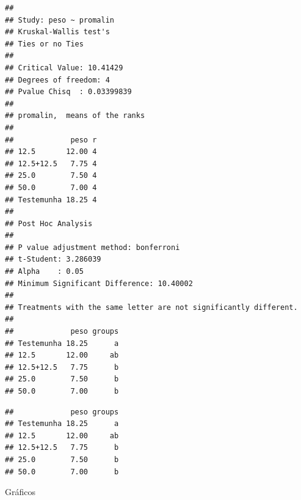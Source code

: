 \documentclass[
]{book}
\newenvironment{Shaded}{\begin{snugshade}}{\end{snugshade}}
\newcommand{\DataTypeTok}[1]{\textcolor[rgb]{0.13,0.29,0.53}{#1}}
\newcommand{\DecValTok}[1]{\textcolor[rgb]{0.00,0.00,0.81}{#1}}
\newcommand{\FloatTok}[1]{\textcolor[rgb]{0.00,0.00,0.81}{#1}}
\newcommand{\KeywordTok}[1]{\textcolor[rgb]{0.13,0.29,0.53}{\textbf{#1}}}
\newcommand{\NormalTok}[1]{#1}
\newcommand{\OperatorTok}[1]{\textcolor[rgb]{0.81,0.36,0.00}{\textbf{#1}}}
\newcommand{\OtherTok}[1]{\textcolor[rgb]{0.56,0.35,0.01}{#1}}
\newcommand{\StringTok}[1]{\textcolor[rgb]{0.31,0.60,0.02}{#1}}
\begin{document}
\begin{verbatim}
## 
## Study: peso ~ promalin
## Kruskal-Wallis test's
## Ties or no Ties
## 
## Critical Value: 10.41429
## Degrees of freedom: 4
## Pvalue Chisq  : 0.03399839 
## 
## promalin,  means of the ranks
## 
##             peso r
## 12.5       12.00 4
## 12.5+12.5   7.75 4
## 25.0        7.50 4
## 50.0        7.00 4
## Testemunha 18.25 4
## 
## Post Hoc Analysis
## 
## P value adjustment method: bonferroni
## t-Student: 3.286039
## Alpha    : 0.05
## Minimum Significant Difference: 10.40002 
## 
## Treatments with the same letter are not significantly different.
## 
##             peso groups
## Testemunha 18.25      a
## 12.5       12.00     ab
## 12.5+12.5   7.75      b
## 25.0        7.50      b
## 50.0        7.00      b
\end{verbatim}

\begin{Shaded}
\end{Shaded}

\begin{verbatim}
##             peso groups
## Testemunha 18.25      a
## 12.5       12.00     ab
## 12.5+12.5   7.75      b
## 25.0        7.50      b
## 50.0        7.00      b
\end{verbatim}

Gráficos

\begin{Shaded}
\end{Shaded}
\end{document}

